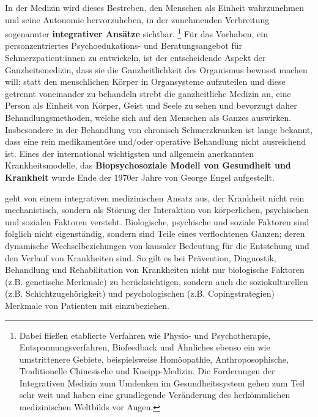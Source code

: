 \documentclass[
  twoside,
  parskip=half-,
]{scrreprt}
\begin{document}
In der Medizin wird dieses Bestreben, den Menschen als Einheit wahrzunehmen und seine Autonomie hervorzuheben, in der zunehmenden Verbreitung sogenannter \textbf{integrativer Ansätze} sichtbar. \footnote{Dabei fließen etablierte Verfahren wie Physio- und Psychotherapie, Entspannungsverfahren, Biofeedback und Ähnliches ebenso ein wie umstrittenere Gebiete, beispielsweise Homöopathie, Anthroposophische, Traditionelle Chinesische und Kneipp-Medizin.  Die Forderungen der Integrativen Medizin zum Umdenken im Gesundheitssystem gehen zum Teil sehr weit und haben eine grundlegende Veränderung des herkömmlichen medizinischen Weltbilds vor Augen.} Für das Vorhaben, ein personzentriertes Psychoedukations- und Beratungsangebot für Schmerzpatient:innen zu entwickeln, ist der entscheidende Aspekt der Ganzheitsmedizin, dass sie die Ganzheitlichkeit des Organismus bewusst machen will; statt den menschlichen Körper in Organsysteme aufzuteilen und diese getrennt voneinander zu behandeln strebt die ganzheitliche Medizin an, eine Person als Einheit von Körper, Geist und Seele zu sehen und bevorzugt daher Behandlungsmethoden, welche sich auf den Menschen als Ganzes auswirken.  Insbesondere in der Behandlung von chronisch Schmerzkranken ist lange bekannt, dass eine rein medikamentöse und/oder operative Behandlung nicht ausreichend ist.  Eines der international wichtigsten und allgemein anerkannten Krankheitsmodelle, das \textbf{Biopsychosoziale Modell von Gesundheit und Krankheit} wurde Ende der 1970er Jahre von George Engel aufgestellt.
\begin{displayquote} geht von einem integrativen medizinischen Ansatz aus, der Krankheit nicht rein mechanistisch, sondern als Störung der Interaktion von körperlichen, psychischen und sozialen Faktoren versteht. Biologische, psychische und soziale Faktoren sind folglich nicht eigenständig, sondern sind Teile eines verflochtenen Ganzen;  deren dynamische Wechselbeziehungen von kausaler Bedeutung für die Entstehung und den Verlauf von Krankheiten sind. So gilt es bei Prävention, Diagnostik, Behandlung und Rehabilitation von Krankheiten nicht nur biologische Faktoren (z.B. genetische Merkmale) zu berücksichtigen, sondern auch die soziokulturellen (z.B. Schichtzugehörigkeit) und psychologischen (z.B. Copingstrategien) Merkmale von Patienten mit einzubeziehen.
\end{displayquote}
\end{document}
